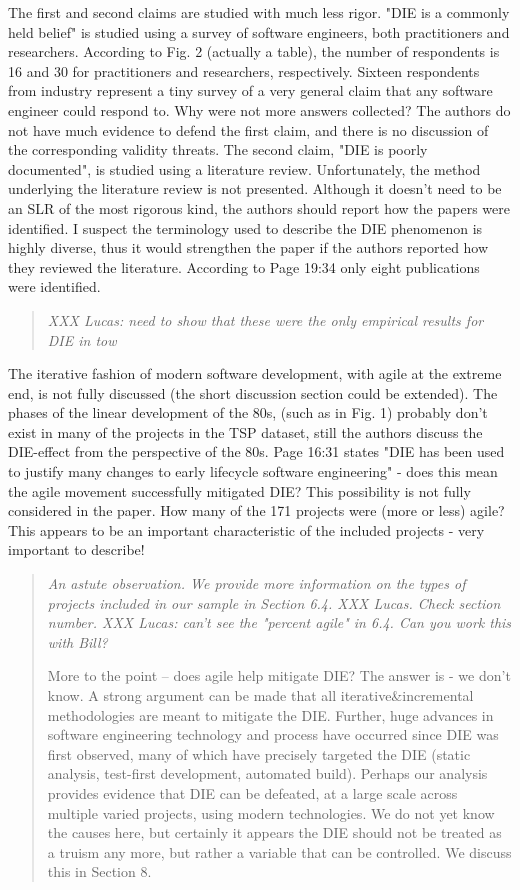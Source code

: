 The first and second claims are studied with much less
rigor. "DIE is a commonly held belief" is studied using a
survey of software engineers, both practitioners and
researchers. According to Fig. 2 (actually a table), the
number of respondents is 16 and 30 for practitioners and
researchers, respectively. Sixteen respondents from industry
represent a tiny survey of a very general claim that any
software engineer could respond to. Why were not more
answers collected? The authors do not have much evidence to
defend the first claim, and there is no discussion of the
corresponding validity threats. The second claim, "DIE is
poorly documented", is studied using a literature review.
Unfortunately, the method underlying the literature review
is not presented. Although it doesn't need to be an SLR of
the most rigorous kind, the authors should report how the
papers were identified. I suspect the terminology used to
describe the DIE phenomenon is highly diverse, thus it would
strengthen the paper if the authors reported how they
reviewed the literature. According to Page 19:34 only eight
publications were identified. 

\begin{quote}{\em XXX
Lucas: need to show that these were the only empirical
results for DIE in tow
}\end{quote}

The iterative fashion of modern software development,
with agile at the extreme end, is not fully discussed (the
short discussion section could be extended). The phases of
the linear development of the 80s, (such as in Fig. 1)
probably don't exist in many of the projects in the TSP
dataset, still the authors discuss the DIE-effect from the
perspective of the 80s. Page 16:31 states "DIE has been used
to justify many changes to early lifecycle software
engineering" - does this mean the agile movement
successfully mitigated DIE? This possibility is not fully
considered in the paper.
How many of the 171 projects were
(more or less) agile? This appears to be an important
characteristic of the included projects - very important to
describe! 

\begin{quote}{\em An astute observation. We provide more information on the types of projects included in our sample in Section 6.4. XXX Lucas. Check section number.
XXX Lucas: can't see the "percent agile" in 6.4. Can you work this with Bill?

More to the point -- does agile help mitigate DIE? The answer is - we don't know. A strong argument can be made that all iterative&incremental methodologies are meant to mitigate the DIE. Further, huge advances in software engineering technology and process have occurred since DIE was first observed, many of which have precisely targeted the DIE (static analysis, test-first development, automated build). Perhaps our analysis provides evidence that DIE can be defeated, at a large scale across multiple varied projects, using modern technologies. We do not yet know the causes here, but certainly it appears the DIE should not be treated as a truism any more, but rather a variable that can be controlled. We discuss this in Section 8.
}\end{quote}



